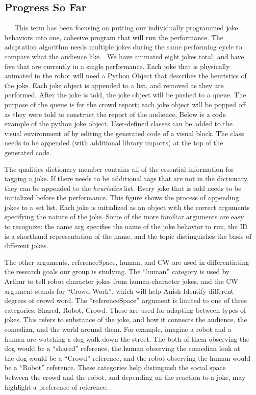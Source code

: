 ﻿\documentclass[onecolumn, draftclsnofoot,10pt, compsoc]{IEEEtran}
\begin{document}
\subsection{Progress So Far}
   This term has been focusing on putting our individually programmed joke behaviors into one, cohesive program that will run the performance. The adaptation algorithm needs multiple jokes during the same performing cycle to compare what the audience like.  We have animated eight jokes total, and have five that are currently in a single performance. Each joke that is physically animated in the robot will need a Python Object that describes the heuristics of the joke. Each joke object is appended to a list, and removed as they are performed. After the joke is told, the joke object will be pushed to a queue. The purpose of the queue is for the crowd report; each joke object will be popped off as they were told to construct the report of the audience. Below is a code example of the python joke object.
User-defined classes can be added to the visual environment of  by editing the generated code of a visual block. The class needs to be appended (with additional library imports) at the top of the generated code.

The qualities dictionary member contains all of the essential information for tagging a joke. If there needs to be additional tags that are not in the dictionary, they can be appended to the \textit{heuristics} list. Every joke that is told needs to be initialized before the performance. This figure shows the process of appending jokes to a set list.
Each joke is initialized as an object with the correct arguments specifying the nature of the joke. Some of the more familiar arguments are easy to recognize: the name arg specifies the name of the joke behavior to run, the ID is a shorthand representation of the name, and the topic distinguishes the basis of different jokes.

The other arguments, referenceSpace, human, and CW are used in differentiating the research goals our group is studying. The “human” category is used by Arthur to tell robot character jokes from human-character jokes, and the CW argument stands for “Crowd Work”, which will help Anish Identify different degrees of crowd word. 
The “referenceSpace” argument is limited to one of three categories; Shared, Robot, Crowd. These are used for adapting between types of jokes. This refers to substance of the joke, and how it connects the audience, the comedian, and the world around them. For example, imagine a robot and a human are watching a dog walk down the street. The both of them observing the dog would be a “shared” reference, the human observing the comedian look at the dog would be a “Crowd” reference, and the robot observing the human would be a “Robot” reference. These categories help distinguish the social space between the crowd and the robot, and depending on the reaction to a joke, may highlight a preference of reference.
\end{document}
